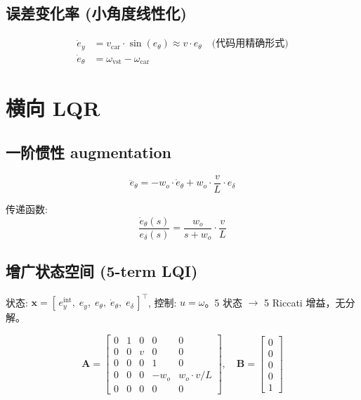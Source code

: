 \documentclass[11pt,a4paper]{article}
\begin{document}
\subsection{误差变化率 (小角度线性化)}

\begin{align}
\dot{e}_y &= v_{\text{car}} \cdot \sin(e_\theta) \approx v \cdot e_\theta \quad\text{(代码用精确形式)}\\
\dot{e}_\theta &= \omega_{\text{vst}} - \omega_{\text{car}}
\end{align}

\section{横向 LQR}

\subsection{一阶惯性 augmentation}

\begin{equation}
\ddot{e}_\theta = -w_o \cdot \dot{e}_\theta + w_o \cdot \frac{v}{L} \cdot e_\delta
\end{equation}

传递函数:
\begin{equation}
\frac{\dot{e}_\theta(s)}{e_\delta(s)} = \frac{w_o}{s + w_o} \cdot \frac{v}{L}
\end{equation}

\subsection{增广状态空间 (5-term LQI)}

状态: $\mathbf{x} = [\,e_y^{\text{int}},\; e_y,\; e_\theta,\; \dot{e}_\theta,\; e_\delta\,]^\top$, 控制: $u = \omega$。5 状态 $\to$ 5 Riccati 增益，无分解。

\begin{equation}
\boxed{
\mathbf{A} =
\begin{bmatrix}
0 & 1 & 0 & 0      & 0            \\
0 & 0 & v & 0      & 0            \\
0 & 0 & 0 & 1      & 0            \\
0 & 0 & 0 & -w_o   & w_o \cdot v/L \\
0 & 0 & 0 & 0      & 0
\end{bmatrix},
\quad
\mathbf{B} =
\begin{bmatrix}
0 \\ 0 \\ 0 \\ 0 \\ 1
\end{bmatrix}
}
\end{equation}
\end{document}
